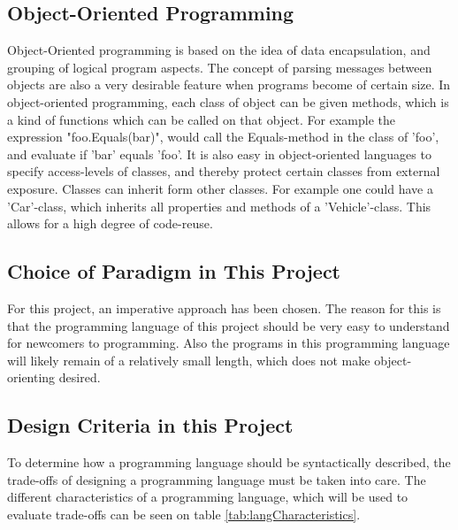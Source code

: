 \subsection{Object-Oriented Programming}
Object-Oriented programming is based on the idea of data encapsulation, and grouping of logical program aspects. The concept of parsing messages between objects are also a very desirable feature when programs become of certain size. In object-oriented programming, each class of object can be given methods, which is a kind of functions which can be called on that object. For example the expression "foo.Equals(bar)", would call the Equals-method in the class of 'foo', and evaluate if 'bar' equals 'foo'. It is also easy in object-oriented languages to specify access-levels of classes, and thereby protect certain classes from external exposure.  Classes can inherit form other classes. For example one could have a 'Car'-class, which inherits all properties and methods of a 'Vehicle'-class. This allows for a high degree of code-reuse.

\subsection{Choice of Paradigm in This Project}
For this project, an imperative approach has been chosen. The reason for this is that the programming language of this project should be very easy to understand for newcomers to programming. Also the programs in this programming language will likely remain of a relatively small length, which does not make object-orienting desired.

\subsection{Design Criteria in this Project}
To determine how a programming language should be syntactically described, the trade-offs of designing a programming language must be taken into care. The different characteristics of a programming language, which will be used to evaluate trade-offs can be seen on table \ref{tab:langCharacteristics}.

